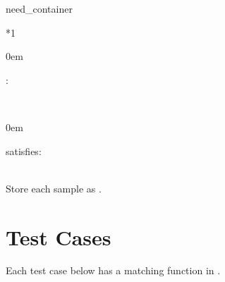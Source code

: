\documentclass[a4paper,10pt,english]{sphinxmanual}
\begin{document}
\begin{sphinxuseclass}{need_container}

\begin{savenotes}\sphinxattablestart
\sphinxthistablewithglobalstyle
\centering
{}\label{\detokenize{requirements/specifications:SPEC_LOG_FORMAT}}\nobreak
\begin{tabular}[t]{*{1}{}}
\sphinxtoprule
\sphinxtableatstartofbodyhook
\begin{DUlineblock}{0em}
\item[] :  
\end{DUlineblock}
\\
\sphinxhline
\begin{DUlineblock}{0em}
\item[] 
\item[] 
\item[] 
\item[] 
\item[] 
\item[] 
\item[] \item[] satisfies: 

\end{DUlineblock}
\\
\sphinxhline
\sphinxAtStartPar
Store each sample as .
\\
\sphinxbottomrule
\end{tabular}
\sphinxtableafterendhook\par
\sphinxattableend\end{savenotes}

\end{sphinxuseclass}
\sphinxstepscope


\chapter{Test Cases}
\label{\detokenize{requirements/tests:test-cases}}\label{\detokenize{requirements/tests::doc}}
\sphinxAtStartPar
Each test case below has a matching function in .
\end{document}
